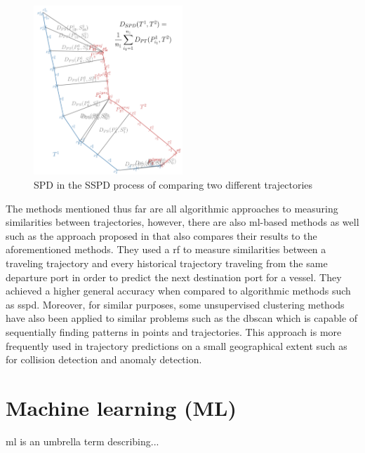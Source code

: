\begin{figure}[htbp]  %
    \centering
    \includegraphics[width=0.5\textwidth]{figures/sspd}
    \caption{SPD in the SSPD process of comparing two different trajectories \parencite{besse2015review}}
    \label{fig:sspd}
\end{figure}

The methods mentioned thus far are all algorithmic approaches to measuring similarities between trajectories, however, there are also \acrshort{ml}-based methods as well such as the approach proposed in \cite{ZHANG2020102729} that also compares their results to the aforementioned methods. They used a \acrfull{rf} to measure similarities between a traveling trajectory and every historical trajectory traveling from the same departure port in order to predict the next destination port for a vessel. They achieved a higher general accuracy when compared to algorithmic methods such as \acrshort{sspd}. Moreover, for similar purposes, some unsupervised clustering methods have also been applied to similar problems such as the \acrfull{dbscan} which is capable of sequentially finding patterns in points and trajectories. This approach is more frequently used in trajectory predictions on a small geographical extent such as for collision detection and anomaly detection.

\section{Machine learning (ML)}

\acrfull{ml} is an umbrella term describing...
